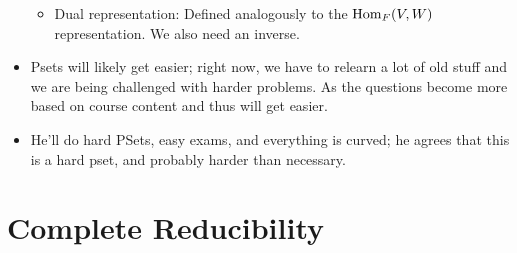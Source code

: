 \documentclass[../notes.tex]{subfiles}
\begin{document}
\begin{itemize}
\begin{itemize}
        \item Dual representation: Defined analogously to the $\operatorname{Hom}_F(V,W)$ representation. We also need an inverse.
    \end{itemize}
    \item Psets will likely get easier; right now, we have to relearn a lot of old stuff and we are being challenged with harder problems. As the questions become more based on course content and thus will get easier.
    \item He'll do hard PSets, easy exams, and everything is curved; he agrees that this is a hard pset, and probably harder than necessary.
\end{itemize}



\section{Complete Reducibility}
\end{document}
